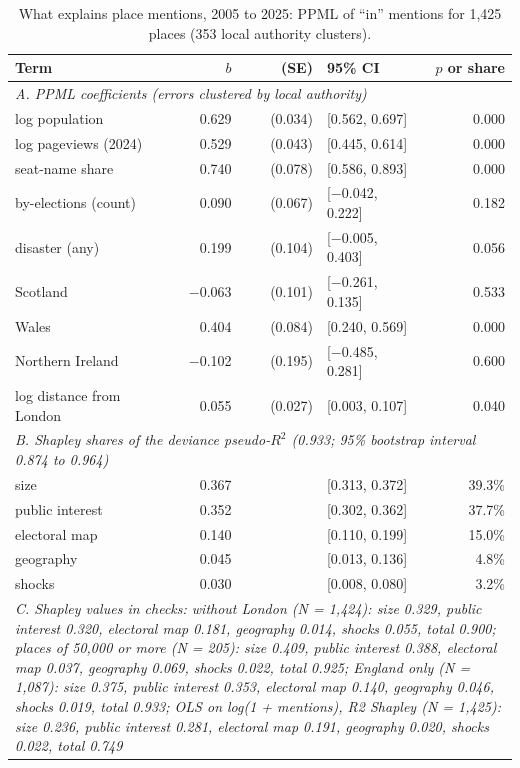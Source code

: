 \documentclass[11pt,a4paper]{article}
\begin{document}
\begin{table}[tbp]\centering\footnotesize\caption{What explains place mentions, 2005 to 2025: PPML of ``in'' mentions for 1,425 places (353 local authority clusters).}\label{tab:drivers}\begin{tabular}{p{6.2cm}rrlr}\toprule Term & $b$ & (SE) & 95\% CI & $p$ or share\\\midrule
\multicolumn{5}{l}{\textit{A. PPML coefficients (errors clustered by local authority)}}\\
\quad log population & 0.629 & (0.034) & [0.562, 0.697] & 0.000\\
\quad log pageviews (2024) & 0.529 & (0.043) & [0.445, 0.614] & 0.000\\
\quad seat-name share & 0.740 & (0.078) & [0.586, 0.893] & 0.000\\
\quad by-elections (count) & 0.090 & (0.067) & [$-$0.042, 0.222] & 0.182\\
\quad disaster (any) & 0.199 & (0.104) & [$-$0.005, 0.403] & 0.056\\
\quad Scotland & $-$0.063 & (0.101) & [$-$0.261, 0.135] & 0.533\\
\quad Wales & 0.404 & (0.084) & [0.240, 0.569] & 0.000\\
\quad Northern Ireland & $-$0.102 & (0.195) & [$-$0.485, 0.281] & 0.600\\
\quad log distance from London & 0.055 & (0.027) & [0.003, 0.107] & 0.040\\
\midrule\multicolumn{5}{l}{\textit{B. Shapley shares of the deviance pseudo-$R^2$ (0.933; 95\% bootstrap interval 0.874 to 0.964)}}\\
\quad size & 0.367 & & [0.313, 0.372] & 39.3\%\\
\quad public interest & 0.352 & & [0.302, 0.362] & 37.7\%\\
\quad electoral map & 0.140 & & [0.110, 0.199] & 15.0\%\\
\quad geography & 0.045 & & [0.013, 0.136] & 4.8\%\\
\quad shocks & 0.030 & & [0.008, 0.080] & 3.2\%\\
\midrule\multicolumn{5}{p{14cm}}{\textit{C. Shapley values in checks: without London (N = 1,424): size 0.329, public interest 0.320, electoral map 0.181, geography 0.014, shocks 0.055, total 0.900; places of 50,000 or more (N = 205): size 0.409, public interest 0.388, electoral map 0.037, geography 0.069, shocks 0.022, total 0.925; England only (N = 1,087): size 0.375, public interest 0.353, electoral map 0.140, geography 0.046, shocks 0.019, total 0.933; OLS on log(1 + mentions), R2 Shapley (N = 1,425): size 0.236, public interest 0.281, electoral map 0.191, geography 0.020, shocks 0.022, total 0.749}}\\
\bottomrule\end{tabular}\end{table}
\end{document}
